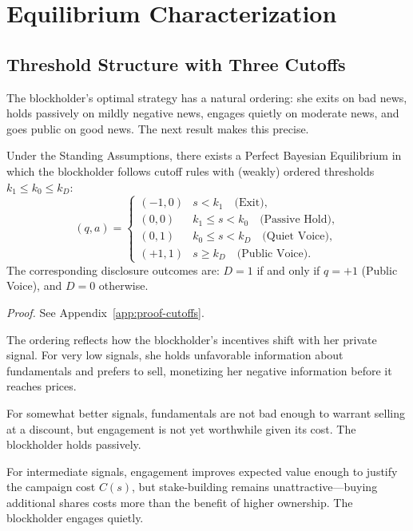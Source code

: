 \section{Equilibrium Characterization}
\label{sec:equilibrium}

\subsection{Threshold Structure with Three Cutoffs}

The blockholder's optimal strategy has a natural ordering: she exits on bad news, holds passively on mildly negative news, engages quietly on moderate news, and goes public on good news. The next result makes this precise.

\begin{proposition}
\label{prop:cutoffs}
Under the Standing Assumptions, there exists a Perfect Bayesian Equilibrium in which the blockholder follows cutoff rules with (weakly) ordered thresholds $k_1 \leq k_0 \leq k_D$:
\[
(q, a) = \begin{cases}
(-1, 0) & s < k_1 \quad \text{(Exit)}, \\
(0, 0) & k_1 \leq s < k_0 \quad \text{(Passive Hold)}, \\
(0, 1) & k_0 \leq s < k_D \quad \text{(Quiet Voice)}, \\
(+1, 1) & s \geq k_D \quad \text{(Public Voice)}.
\end{cases}
\]
The corresponding disclosure outcomes are: $D = 1$ if and only if $q = +1$ (Public Voice), and $D = 0$ otherwise.
\end{proposition}
\textit{Proof.} See Appendix~\ref{app:proof-cutoffs}.

The ordering reflects how the blockholder's incentives shift with her private signal. For very low signals, she holds unfavorable information about fundamentals and prefers to sell, monetizing her negative information before it reaches prices.

For somewhat better signals, fundamentals are not bad enough to warrant selling at a discount, but engagement is not yet worthwhile given its cost. The blockholder holds passively.

For intermediate signals, engagement improves expected value enough to justify the campaign cost $C(s)$, but stake-building remains unattractive---buying additional shares costs more than the benefit of higher ownership. The blockholder engages quietly.

